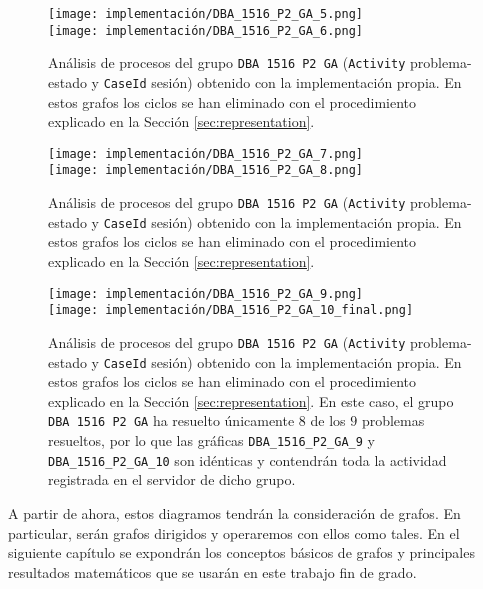 \begin{figure}[H]
\centering
\texttt{[image: implementación/DBA\_1516\_P2\_GA\_5.png]} \\
\texttt{[image: implementación/DBA\_1516\_P2\_GA\_6.png]}
\caption{Análisis de procesos del grupo \texttt{DBA 1516 P2 GA} (\texttt{Activity} problema-estado y \texttt{CaseId} sesión) obtenido con la implementación propia. En estos grafos los ciclos se han eliminado con el procedimiento explicado en la Sección \ref{sec:representation}.}
\label{fig:DBA1516P2GA5}
\end{figure}

\begin{figure}[H]
\centering
\texttt{[image: implementación/DBA\_1516\_P2\_GA\_7.png]} \\
\texttt{[image: implementación/DBA\_1516\_P2\_GA\_8.png]}
\caption{Análisis de procesos del grupo \texttt{DBA 1516 P2 GA} (\texttt{Activity} problema-estado y \texttt{CaseId} sesión) obtenido con la implementación propia. En estos grafos los ciclos se han eliminado con el procedimiento explicado en la Sección \ref{sec:representation}.}
\label{fig:DBA1516P2GA6}
\end{figure}

\begin{figure}[H]
\centering
\texttt{[image: implementación/DBA\_1516\_P2\_GA\_9.png]} \\
\texttt{[image: implementación/DBA\_1516\_P2\_GA\_10\_final.png]}
\caption{Análisis de procesos del grupo \texttt{DBA 1516 P2 GA} (\texttt{Activity} problema-estado y \texttt{CaseId} sesión) obtenido con la implementación propia. En estos grafos los ciclos se han eliminado con el procedimiento explicado en la Sección \ref{sec:representation}. En este caso, el grupo \texttt{DBA 1516 P2 GA} ha resuelto únicamente $8$ de los $9$ problemas resueltos, por lo que las gráficas \texttt{DBA\_1516\_P2\_GA\_9} y \texttt{DBA\_1516\_P2\_GA\_10} son idénticas y contendrán toda la actividad registrada en el servidor de dicho grupo.}
\label{fig:DBA1516P2GA7}
\end{figure}

A partir de ahora, estos diagramos tendrán la consideración de grafos. En particular, serán grafos dirigidos y operaremos con ellos como tales. En el siguiente capítulo se expondrán los conceptos básicos de grafos y principales resultados matemáticos que se usarán en este trabajo fin de grado.